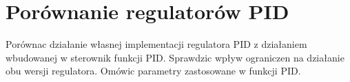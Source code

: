\section{Porównanie regulatorów PID}
\label{lab:zad13}


%    
Porównac działanie własnej implementacji regulatora PID z działaniem wbudowanej
w sterownik funkcji PID. Sprawdzic wpływ ograniczen na działanie obu wersji regulatora.
Omówic parametry zastosowane w funkcji PID.


\newpage
